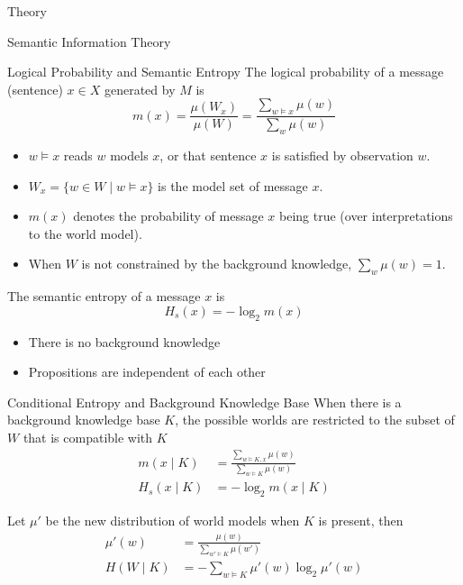 \documentclass[presentation,mathserif,9pt]{beamer}
\begin{document}
\begin{section}{Theory}
\begin{subsection}{Semantic Information Theory}
		\begin{frame}{Logical Probability and Semantic Entropy}
			The {\color{blue} logical probability} of a message (sentence) $x \in X$ generated by $M$ is
			\begin{equation}
				m(x) = \frac{\mu(W_x)}{\mu(W)} = \frac{\sum_{w \models x} \mu(w)}{\sum_{w} \mu(w)}
			\end{equation}
			\vspace{-0.3cm}
			\begin{itemize}
				\item $w \models x$ reads $w$ models $x$, or that sentence $x$ is satisfied by observation $w$.
				\item $W_x = \{w \in W \mid w \models x\}$ is the model set of message $x$.
				\item $m(x)$ denotes the probability of message $x$ being true (over interpretations to the world model).
				\item When $W$ is not constrained by the background knowledge, $\sum_{w} \mu(w)=1$.
			\end{itemize}
			\singlespacing
			The {\color{blue} semantic entropy} of a message $x$ is
			\begin{equation}
				H_s(x) = -\log_2 m(x)
			\end{equation}
			\vspace{-0.3cm}
			\begin{itemize}
				\item There is no {\color{gray}background knowledge}
				\item Propositions are {\color{gray}independent} of each other
			\end{itemize}
		\end{frame}

		\begin{frame}{Conditional Entropy and Background Knowledge Base}
			When there is a background knowledge base $K$, the possible worlds are restricted to the subset of $W$ that is compatible with $K$
			\begin{align}
				m(x \mid K)   & = \frac{\sum_{w \models K, x} \mu(w)}{\sum_{w \models K} \mu(w)} \\
				H_s(x \mid K) & = -\log_2 m(x \mid K)
			\end{align}

			Let $\mu'$ be the new distribution of world models when $K$ is present, then
			\begin{align}
				\mu'(w)     & = \frac{\mu(w)}{\sum_{w' \models K} \mu(w')}  \\
				H(W \mid K) & = - \sum_{w \models K} \mu'(w) \log_2 \mu'(w)
			\end{align}
		\end{frame}


\end{subsection}
\end{section}
\end{document}
